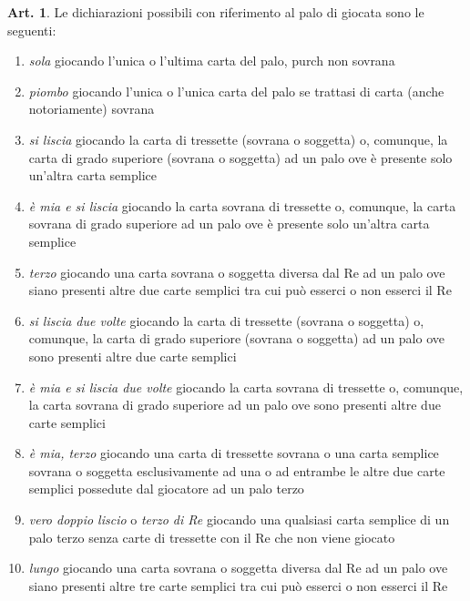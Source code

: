 \documentclass[italian,a4paper]{article}
\theoremstyle{definition}
\newtheorem{art}{Art.}
\begin{document}
\begin{art}
Le dichiarazioni possibili con riferimento al palo di giocata sono le
seguenti:

\begin{enumerate}
    \item        \emph{sola} giocando l’unica o l’ultima carta del palo, purch non
sovrana

\item        \emph{piombo} giocando l’unica o l’unica carta del palo se trattasi di
carta (anche notoriamente) sovrana

\item        \emph{si liscia} giocando la carta di tressette (sovrana o soggetta) o,
comunque, la carta di grado superiore (sovrana o soggetta) ad un palo ove è
presente solo un’altra carta semplice

\item        \emph{è mia e si liscia} giocando la carta sovrana di tressette o,
comunque, la carta sovrana di grado superiore ad un palo ove è presente solo
un’altra carta semplice

\item        \emph{terzo} giocando una carta sovrana o soggetta diversa dal Re ad un
palo ove siano presenti altre due carte semplici tra cui può esserci o non
esserci il Re

\item       \emph{si liscia due volte} giocando la carta di tressette (sovrana o
soggetta) o, comunque, la carta di grado superiore (sovrana o soggetta) ad
un palo ove sono  presenti altre due carte semplici

\item        \emph{è mia e si liscia due volte} giocando la carta sovrana di
tressette o, comunque, la carta sovrana di grado superiore ad un palo ove
sono presenti altre due carte semplici

\item       \emph{è mia, terzo} giocando una carta di tressette sovrana o una carta
semplice sovrana o soggetta esclusivamente ad una o ad entrambe le altre due
carte semplici possedute dal giocatore ad un palo terzo 

\item        \emph{vero doppio liscio} o \emph{terzo di Re} giocando una qualsiasi carta
semplice di un palo terzo senza carte di tressette con il Re che non viene
giocato

\item      \emph{lungo} giocando una carta sovrana o soggetta diversa dal Re ad un
palo ove siano presenti altre tre carte semplici tra cui può esserci o non
esserci il Re


\end{enumerate}
\end{art}
\end{document}
